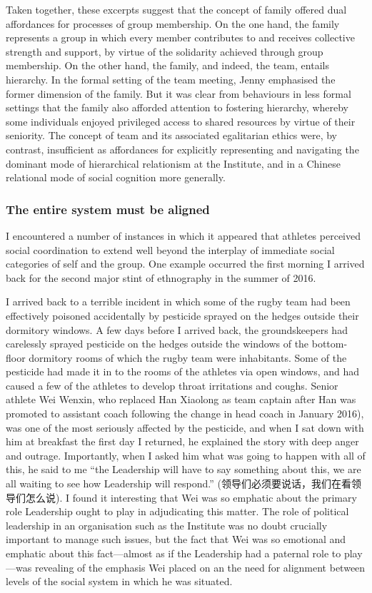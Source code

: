\begin{CJK}{UTF8}{gbsn}
Taken together, these excerpts suggest that the concept of family offered dual affordances for processes of group membership.  On the one hand, the family represents a group in which every member contributes to and receives collective strength and support, by virtue of the solidarity achieved through group membership.  On the other hand, the family, and indeed, the team, entails hierarchy.  In the formal setting of the team meeting, Jenny emphasised the former dimension of the family.  But it was clear from behaviours in less formal settings that the family also afforded attention to fostering hierarchy, whereby some individuals enjoyed privileged access to shared resources by virtue of their seniority.  The concept of team and its associated egalitarian ethics were, by contrast, insufficient as affordances for explicitly representing and navigating the dominant mode of hierarchical relationism at the Institute, and in a Chinese relational mode of social cognition more generally.


\subsubsection{The entire system must be aligned \label{sect:systemAligned}}
I encountered a number of instances in which it appeared that athletes perceived social coordination to extend well beyond the interplay of immediate social categories of self and the group.  One example occurred the first morning I arrived back for the second major stint of ethnography in the summer of 2016.

I arrived back to a terrible incident in which some of the rugby team had been effectively poisoned accidentally by pesticide sprayed on the hedges outside their dormitory windows.  A few days before I arrived back, the groundskeepers had carelessly sprayed pesticide on the hedges outside the windows of the bottom-floor dormitory rooms of which the rugby team were inhabitants.  Some of the pesticide had made it in to the rooms of the athletes via open windows, and had caused a few of the athletes to develop throat irritations and coughs.
Senior athlete Wei Wenxin, who replaced Han Xiaolong as team captain after Han was promoted to assistant coach following the change in head coach in January 2016), was one of the most seriously affected by the pesticide, and when I sat down with him at breakfast the first day I returned, he explained the story with deep anger and outrage.  Importantly, when I asked him what was going to happen with all of this, he said to me ``the Leadership will have to say something about this, we are all waiting to see how Leadership will respond.'' (领导们必须要说话，我们在看领导们怎么说).  I found it interesting that Wei was so emphatic about the primary role Leadership ought to play in adjudicating this matter.  The role of political leadership in an organisation such as the Institute was no doubt crucially important to manage such issues, but the fact that Wei was so emotional and emphatic about this fact---almost as if the Leadership had a paternal role to play---was revealing of the emphasis Wei placed on an the need for alignment between levels of the social system in which he was situated.


\end{CJK}
